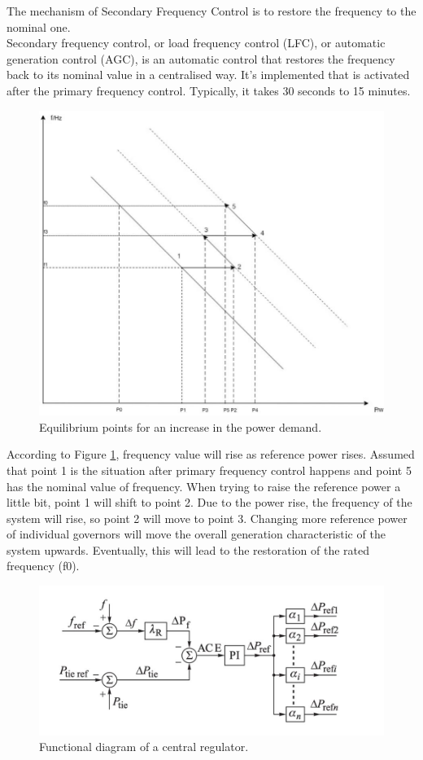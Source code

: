 \documentclass{report}
\begin{document}
The mechanism of Secondary Frequency Control is to restore the frequency to the nominal one.\\

Secondary frequency control, or load frequency control (LFC), or automatic generation control (AGC), is an automatic control that restores the frequency back to its nominal value in a centralised way. It's implemented that is activated after the primary frequency control. Typically, it takes 30 seconds to 15 minutes.\\

\begin{figure}[htb]
\centering
\includegraphics[width = .5\textwidth]{Figure/theory_sfc.png}
\caption{Equilibrium points for an increase in the power demand.}
\label{theory_sfc}
\end{figure}

According to Figure \ref{theory_sfc}, frequency value will rise as reference power rises. Assumed that point 1 is the situation after primary frequency control happens and point 5 has the nominal value of frequency. When trying to raise the reference power a little bit, point 1 will shift to point 2. Due to the power rise, the frequency of the system will rise, so point 2 will move to point 3. Changing more reference power of individual governors will move the overall generation characteristic of the system upwards. Eventually, this will lead to the restoration of the rated frequency (f0).\\

\begin{figure}[htb]
\centering
\includegraphics[width = .618\textwidth]{Figure/agc_blockDiagram.png}
\caption{Functional diagram of a central regulator.}
\label{agc_blockDiagram}
\end{figure}
\end{document}
